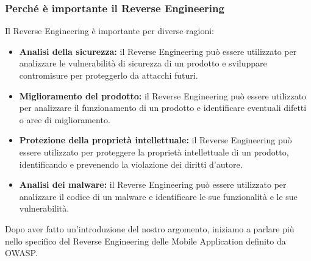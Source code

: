 \documentclass{article}
\begin{document}
\subsubsection{Perché è importante il Reverse Engineering}
Il Reverse Engineering è importante per diverse ragioni:

\begin{itemize}
    \item \textbf{Analisi della sicurezza:} il Reverse Engineering può essere utilizzato per analizzare le vulnerabilità di sicurezza di un prodotto e sviluppare contromisure per proteggerlo da attacchi futuri.
    \item \textbf{Miglioramento del prodotto:} il Reverse Engineering può essere utilizzato per analizzare il funzionamento di un prodotto e identificare eventuali difetti o aree di miglioramento.
    \item \textbf{Protezione della proprietà intellettuale:} il Reverse Engineering può essere utilizzato per proteggere la proprietà intellettuale di un prodotto, identificando e prevenendo la violazione dei diritti d'autore.
    \item \textbf{Analisi dei malware:} il Reverse Engineering può essere utilizzato per analizzare il codice di un malware e identificare le sue funzionalità e le sue vulnerabilità.
\end{itemize}


Dopo aver fatto un'introduzione del nostro argomento, iniziamo a parlare più nello specifico del Reverse Engineering delle Mobile Application definito da OWASP.

\end{document}
